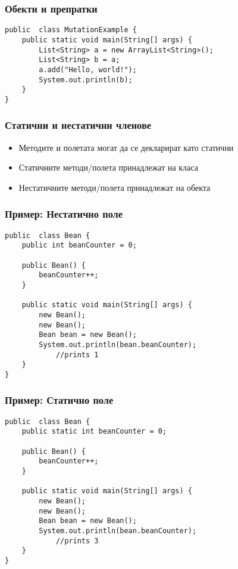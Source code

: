 \documentclass[ignorenonframetext, hyperref=unicode,compress]{beamer}
\begin{document}
\begin{frame}[containsverbatim]\frametitle{Обекти и препратки}
\begin{lstlisting}
public  class MutationExample {
 	public static void main(String[] args) {
		List<String> a = new ArrayList<String>();
		List<String> b = a; 
		a.add("Hello, world!");
		System.out.println(b);
	}
}
\end{lstlisting}

\begin{center}
\end{center}

\end{frame}

\begin{frame}[containsverbatim]\frametitle{Статични и нестатични членове}
\begin{itemize}
 \item Методите и полетата могат да се декларират като статични
 \item Статичните методи/полета принадлежат на класа
 \item Нестатичните методи/полета принадлежат на обекта
\end{itemize}
\end{frame}

\begin{frame}[containsverbatim]\frametitle{Пример: Нестатично поле}
\begin{lstlisting}
public  class Bean {
 	public int beanCounter = 0;

 	public Bean() {
 		beanCounter++;
	}

 	public static void main(String[] args) {
 		new Bean();
 		new Bean();
 		Bean bean = new Bean();
 		System.out.println(bean.beanCounter);
			//prints 1
	}
}
\end{lstlisting}
\end{frame}


\begin{frame}[containsverbatim]\frametitle{Пример: Статично поле}
\begin{lstlisting}
public  class Bean {
 	public static int beanCounter = 0;

 	public Bean() {
 		beanCounter++;
	}

 	public static void main(String[] args) {
 		new Bean();
 		new Bean();
 		Bean bean = new Bean();
 		System.out.println(bean.beanCounter);
			//prints 3
	}
}
\end{lstlisting}
\end{frame}
\end{document}
